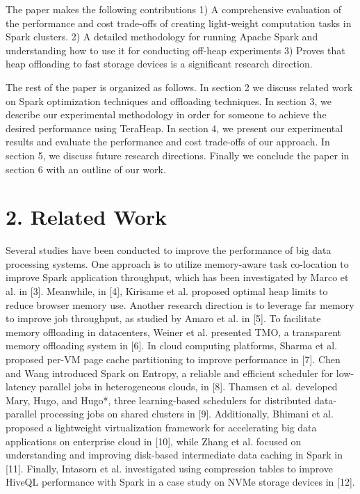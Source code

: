 \documentclass[twocolumn,10pt]{asme2e}
\begin{document}
The paper makes the following contributions 1) A comprehensive evaluation of the performance and cost trade-offs of creating light-weight computation tasks in Spark clusters. 2) A detailed methodology for running Apache Spark and understanding how to use it for conducting off-heap experiments 3) Proves that heap offloading to fast storage devices is a significant research direction. 

The rest of the paper is organized as follows. In section 2 we discuss related work on Spark optimization techniques and offloading techniques. In section 3, we describe our experimental methodology in order for someone to achieve the desired performance using TeraHeap. In section 4, we present our experimental results and evaluate the performance and cost trade-offs of our approach. In section 5, we discuss future research directions. Finally we conclude the paper in section 6 with an outline of our work.

\section*{2. Related Work}

Several studies have been conducted to improve the performance of big data processing systems. One approach is to utilize memory-aware task co-location to improve Spark application throughput, which has been investigated by Marco et al. in [3]. Meanwhile, in [4], Kirisame et al. proposed optimal heap limits to reduce browser memory use. Another research direction is to leverage far memory to improve job throughput, as studied by Amaro et al. in [5]. To facilitate memory offloading in datacenters, Weiner et al. presented TMO, a transparent memory offloading system in [6]. In cloud computing platforms, Sharma et al. proposed per-VM page cache partitioning to improve performance in [7]. Chen and Wang introduced Spark on Entropy, a reliable and efficient scheduler for low-latency parallel jobs in heterogeneous clouds, in [8]. Thamsen et al. developed Mary, Hugo, and Hugo*, three learning-based schedulers for distributed data-parallel processing jobs on shared clusters in [9]. Additionally, Bhimani et al. proposed a lightweight virtualization framework for accelerating big data applications on enterprise cloud in [10], while Zhang et al. focused on understanding and improving disk-based intermediate data caching in Spark in [11]. Finally, Intasorn et al. investigated using compression tables to improve HiveQL performance with Spark in a case study on NVMe storage devices in [12]. 
\end{document}
